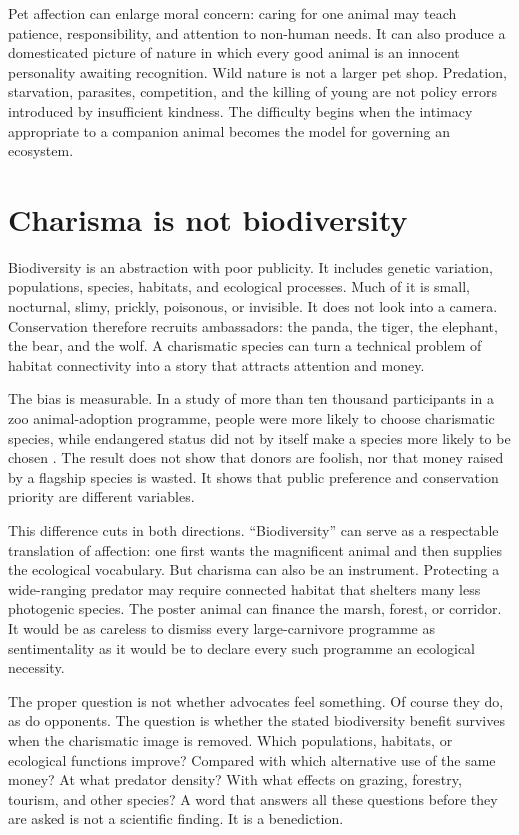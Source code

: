﻿\documentclass[12pt,a4paper]{book}
\begin{document}
Pet affection can enlarge moral concern: caring for one animal may teach
patience, responsibility, and attention to non-human needs.  It can also
produce a domesticated picture of nature in which every good animal is an
innocent personality awaiting recognition.  Wild nature is not a larger pet
shop.  Predation, starvation, parasites, competition, and the killing of young
are not policy errors introduced by insufficient kindness.  The difficulty
begins when the intimacy appropriate to a companion animal becomes the model
for governing an ecosystem.

\section{Charisma is not biodiversity}

Biodiversity is an abstraction with poor publicity.  It includes genetic
variation, populations, species, habitats, and ecological processes.  Much of
it is small, nocturnal, slimy, prickly, poisonous, or invisible.  It does not
look into a camera.  Conservation therefore recruits ambassadors: the panda,
the tiger, the elephant, the bear, and the wolf.  A charismatic species can
turn a technical problem of habitat connectivity into a story that attracts
attention and money.

The bias is measurable.  In a study of more than ten thousand participants in
a zoo animal-adoption programme, people were more likely to choose charismatic
species, while endangered status did not by itself make a species more likely
to be chosen \cite{ColleonyCharisma2017}.  The result does not show that donors
are foolish, nor that money raised by a flagship species is wasted.  It shows
that public preference and conservation priority are different variables.

This difference cuts in both directions.  ``Biodiversity'' can serve as a
respectable translation of affection: one first wants the magnificent animal
and then supplies the ecological vocabulary.  But charisma can also be an
instrument.  Protecting a wide-ranging predator may require connected habitat
that shelters many less photogenic species.  The poster animal can finance the
marsh, forest, or corridor.  It would be as careless to dismiss every
large-carnivore programme as sentimentality as it would be to declare every
such programme an ecological necessity.

The proper question is not whether advocates feel something.  Of course they
do, as do opponents.  The question is whether the stated biodiversity benefit
survives when the charismatic image is removed.  Which populations, habitats,
or ecological functions improve?  Compared with which alternative use of the
same money?  At what predator density?  With what effects on grazing,
forestry, tourism, and other species?  A word that answers all these questions
before they are asked is not a scientific finding.  It is a benediction.
\end{document}
